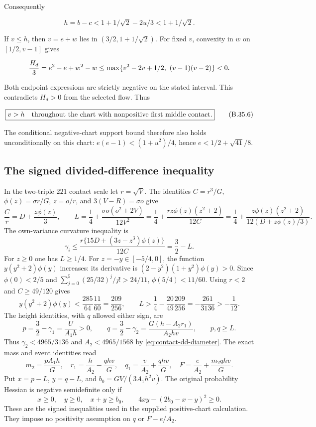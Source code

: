 Consequently

\[
 h=b-c<1+1/\sqrt2-2u/3<1+1/\sqrt2.
\tag{B.35.5}\label{contact:two-triple-221-negative-middle-location-5}
\]

If $v\le h$, then $v=e+w$ lies in $(3/2,1+1/\sqrt{2})$.
For fixed $v$, convexity in $w$ on $[1/2,v-1]$ gives

\[
 {H_d\over3}=e^2-e+w^2-w
 \le\max\{v^2-2v+1/2,\ (v-1)(v-2)\}<0.
\]

Both endpoint expressions are strictly negative on the stated interval.
This contradicts $H_d>0$ from the selected flow. Thus

\[
 \boxed{v>h\quad\hbox{throughout the chart with nonpositive first middle contact}.}
\tag{B.35.6}\label{contact:two-triple-221-negative-middle-location-6}
\]

The conditional negative-chart support bound therefore
also holds unconditionally on this chart:
$e(e-1)<(1+u^2)/4$, hence $e<1/2+\sqrt{41}/8$.
\subsection{The signed divided-difference inequality}\label{contact:two-triple-221-corrected-dd-load}
In the two-triple $221$ contact scale let $r=\sqrt V$. The identities
$C=r^3/G$, $\phi(z)=\sigma r/G$, $z=o/r$, and $3(V-R)=\sigma o$ give
\[
 \frac Cr=D+\frac{z\phi(z)}3,\qquad
 L=\frac14+\frac{\sigma o(o^2+2V)}{12V^2}
  =\frac14+\frac{rz\phi(z)(z^2+2)}{12C}
  =\frac14+\frac{z\phi(z)(z^2+2)}{12(D+z\phi(z)/3)}.
\]
The own-variance curvature inequality is
\[
 \gamma_i\le\frac{r\{15D+(3z-z^3)\phi(z)\}}{12C}=\frac32-L.
\]
For $z\ge0$ one has $L\ge1/4$. For $z=-y\in[-5/4,0]$, the function
$y(y^2+2)\phi(y)$ increases: its derivative is
$(2-y^2)(1+y^2)\phi(y)>0$. Since
$\phi(0)<2/5$ and $\sum_{j=0}^5(25/32)^j/j!>24/11$,
$\phi(5/4)<11/60$. Using $r<2$ and $C\ge49/120$ gives
\[
 y(y^2+2)\phi(y)<\frac{285}{64}\frac{11}{60}=\frac{209}{256},
 \qquad L>\frac14-\frac{20}{49}\frac{209}{256}
 =-\frac{261}{3136}>-\frac1{12}.
\]
The height identities, with $q$ allowed either sign, are
\[
 p=\frac32-\gamma_1=\frac{U}{A_1h}>0,\qquad
 q=\frac32-\gamma_2=\frac{G(h-A_2r_1)}{A_2hv},\qquad p,q\ge L.
\]
Thus $\gamma_2<4965/3136$ and $A_2<4965/1568$ by
\eqref{eq:contact-dd-diameter}. The exact mass and event identities read
\[
 m_2=\frac{pA_1h}{G},\quad
 r_1=\frac h{A_2}-\frac{qhv}{G},\quad
 q_1=\frac v{A_2}+\frac{qhv}{G},\quad
 F=\frac e{A_2}+\frac{m_2qhv}{G}.
\]
Put $x=p-L$, $y=q-L$, and $b_0=GV/(3A_1h^2v)$. The original
probability Hessian is negative semidefinite only if
\[
 x\ge0,\quad y\ge0,\quad x+y\ge b_0,\qquad
 4xy-(2b_0-x-y)^2\ge0.
\]
These are the signed inequalities used in the supplied positive-chart
calculation. They impose no positivity assumption on $q$ or $F-e/A_2$.

